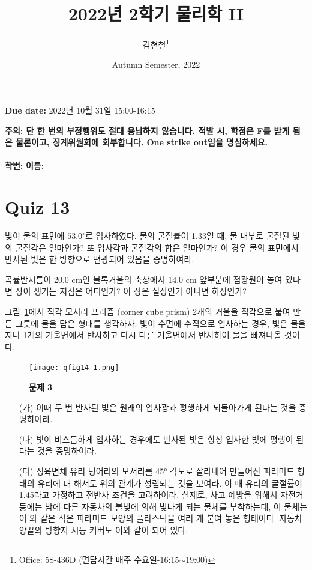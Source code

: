 \documentclass[tightenlines,floatfix,nofootinbib,superscriptaddress,fleqn]{revtex4}
\begin{document}
\title{\Large 2022년 2학기 물리학 II}
\author{김현철\footnote{Office: 5S-436D (면담시간 매주
    수요일-16:15$\sim$19:00)}} 
\date{Autumn Semester, 2022}

\maketitle

{\color{red} {\bf Due date:} 2022년 10월 31일  15:00-16:15 }
\vspace{1.cm}

\noindent \textbf{ 주의: \color{blue} 단 한 번의 부정행위도 절대
  용납하지 않습니다. 적발 시, 학점은 F를 받게 됨은 물론이고,
  징계위원회에 회부합니다. One strike out임을 명심하세요.} 
\\
\\

{\bf 학번:} \hspace{4cm}
{\bf 이름:} 

\section*{\large Quiz 13}
빛이 물의 표면에 $53.0^\circ$로 입사하였다. 물의 굴절률이 1.33일 때, 물
내부로 굴절된 빛의 굴절각은 얼마인가? 또 입사각과 굴절각의 합은
얼마인가? 이 경우 물의 표면에서 반사된 빛은 한 방향으로 편광되어
있음을 증명하여라. 
\newpage

곡률반지름이 20.0 cm인 볼록거울의 축상에서 14.0 cm 앞부분에 점광원이
놓여 있다면 상이 생기는 지점은 어디인가? 이 상은 실상인가 아니면 허상인가?
\newpage

그림~\ref{fig:1}에서 직각 모서리 프리즘 (corner cube prism) 2개의 거울을
직각으로 붙여 만든 그릇에 물을 담은 형태를 생각하자. 빛이 수면에
수직으로 입사하는 경우, 빛은 물을 지나 1개의 거울면에서 반사하고 다시
다른 거울면에서 반사하여 물을 빠져나올 것이다.
\begin{figure}[htp]
  \centering
  \texttt{[image: qfig14-1.png]}
  \caption{\textbf{문제 3}}
  \label{fig:1}
\end{figure}
\begin{itemize}
\item[(가)] 이때 두 번 반사된 빛은 원래의 입사광과 평행하게 되돌아가게
  된다는 것을 증명하여라.
\item[(나)] 빛이 비스듬하게 입사하는 경우에도 반사된 빛은 항상 입사한
  빛에 평행이 된다는 것을 증명하여라.
\item[(다)] 정육면체 유리 덩어리의 모서리를 45° 각도로 잘라내어
  만들어진 피라미드 형태의 유리에 대 해서도 위의 관계가 성립되는 것을
  보여라. 이 때 유리의 굴절률이 1.45라고 가정하고 전반사 조건을
  고려하여라. 실제로, 사고 예방을 위해서 자전거 등에는 밤에 다른
  자동차의 불빛에 의해 빛나게 되는 물체를 부착하는데, 이 물체는 이 와
  같은 작은 피라미드 모양의 플라스틱을 여러 개 붙여 놓은
  형태이다. 자동차 양끝의 방향지 시등 커버도 이와 같이 되어 있다.  
\end{itemize}
\newpage
\end{document}
